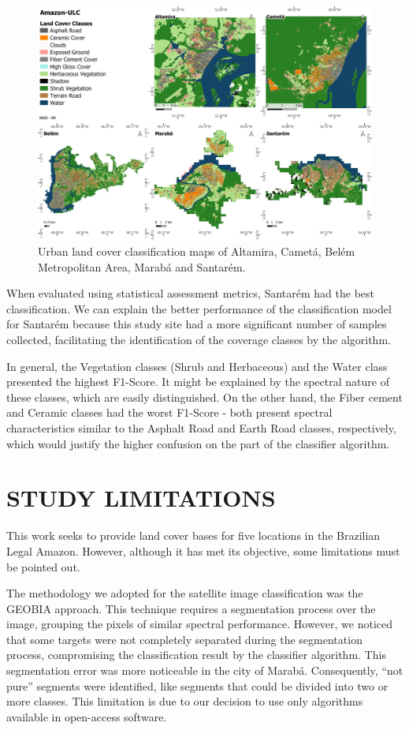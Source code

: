 \documentclass[preprint, 3p,
authoryear]{elsarticle} %
\begin{document}
\begin{figure}
\includegraphics[width=.8\linewidth]{images/ULC_Legend_v2-tile} \caption{\label{fig:fig-land-cover-classes}Urban land cover classification maps of Altamira, Cametá, Belém Metropolitan Area, Marabá and Santarém.}\label{fig:fig-2}
\end{figure}

When evaluated using statistical assessment metrics, Santarém had the
best classification. We can explain the better performance of the
classification model for Santarém because this study site had a more
significant number of samples collected, facilitating the identification
of the coverage classes by the algorithm.

In general, the Vegetation classes (Shrub and Herbaceous) and the Water
class presented the highest F1-Score. It might be explained by the
spectral nature of these classes, which are easily distinguished. On the
other hand, the Fiber cement and Ceramic classes had the worst F1-Score
- both present spectral characteristics similar to the Asphalt Road and
Earth Road classes, respectively, which would justify the higher
confusion on the part of the classifier algorithm.

\hypertarget{study-limitations}{%
\section{STUDY LIMITATIONS}\label{study-limitations}}

This work seeks to provide land cover bases for five locations in the
Brazilian Legal Amazon. However, although it has met its objective, some
limitations must be pointed out.

The methodology we adopted for the satellite image classification was
the GEOBIA approach. This technique requires a segmentation process over
the image, grouping the pixels of similar spectral performance. However,
we noticed that some targets were not completely separated during the
segmentation process, compromising the classification result by the
classifier algorithm. This segmentation error was more noticeable in the
city of Marabá. Consequently, ``not pure'' segments were identified,
like segments that could be divided into two or more classes. This
limitation is due to our decision to use only algorithms available in
open-access software.
\end{document}
